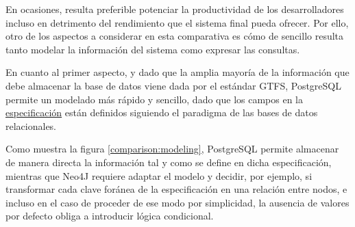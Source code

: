 En ocasiones, resulta preferible potenciar la productividad de los desarrolladores incluso en detrimento del rendimiento que el sistema final pueda ofrecer. Por ello, otro de los aspectos a considerar en esta comparativa es cómo de sencillo resulta tanto modelar la información del sistema como expresar las consultas.

En cuanto al primer aspecto, y dado que la amplia mayoría de la información que debe almacenar la base de datos viene dada por el estándar GTFS, PostgreSQL permite un modelado más rápido y sencillo, dado que los campos en la \href{https://gtfs.org/documentation/schedule/reference/}{especificación} están definidos siguiendo el paradigma de las bases de datos relacionales.

Como muestra la figura \ref{comparison:modeling}, PostgreSQL permite almacenar de manera directa la información tal y como se define en dicha especificación, mientras que Neo4J requiere adaptar el modelo y decidir, por ejemplo, si transformar cada clave foránea de la especificación en una relación entre nodos, e incluso en el caso de proceder de ese modo por simplicidad, la ausencia de valores por defecto obliga a introducir lógica condicional.

